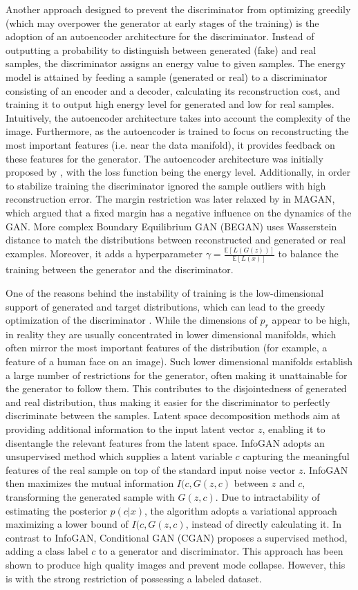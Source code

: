 Another approach designed to prevent the discriminator from optimizing greedily (which may overpower the generator at early stages of the training) is the adoption of an autoencoder architecture for the discriminator. Instead of outputting a probability to distinguish between generated (fake) and real samples, the discriminator assigns an energy value to given samples. The energy model is attained by feeding a sample (generated or real) to a discriminator consisting of an encoder and a decoder, calculating its reconstruction cost, and training it to output high energy level for generated and low for real samples. Intuitively, the autoencoder architecture takes into account the complexity of the image. Furthermore, as the autoencoder is trained to focus on reconstructing the most important features (i.e. near the data manifold), it provides feedback on these features for the generator. The autoencoder architecture was initially proposed by , with the loss function being the energy level. Additionally, in order to stabilize training the discriminator ignored the sample outliers with high reconstruction error. The margin restriction was later relaxed by  in MAGAN, which argued that a fixed margin has a negative influence on the dynamics of the GAN. More complex Boundary Equilibrium GAN (BEGAN)  uses Wasserstein distance to match the distributions between reconstructed and generated or real examples. Moreover, it adds a hyperparameter $\gamma = \frac{\mathbb{E}[L(G(z))]}{\mathbb{E}[L(x)]}$ to balance the training between the generator and the discriminator.

One of the reasons behind the instability of training is the low-dimensional support of generated and target distributions, which can lead to the greedy optimization of the discriminator . While the dimensions of $p_{r}$ appear to be high, in reality they are usually concentrated in lower dimensional manifolds, which often mirror the most important features of the distribution (for example, a feature of a human face on an image). Such lower dimensional manifolds establish a large number of restrictions for the generator, often making it unattainable for the generator to follow them. This contributes to the disjointedness of generated and real distribution, thus making it easier for the discriminator to perfectly discriminate between the samples.
Latent space decomposition methods aim at providing additional information to the input latent vector $z$, enabling it to disentangle the relevant features from the latent space. InfoGAN  adopts an unsupervised method which supplies a latent variable $c$ capturing the meaningful features of the real sample on top of the standard input noise vector $z$. InfoGAN then maximizes the mutual information $I(c, G(z,c)$ between $z$ and $c$, transforming the generated sample with $G(z, c)$. Due to intractability of estimating the posterior $p(c|x)$, the algorithm adopts a variational approach maximizing a lower bound of $I(c, G(z,c)$, instead of directly calculating it.
In contrast to InfoGAN, Conditional GAN (CGAN)  proposes a supervised method, adding a class label $c$ to a generator and discriminator. This approach has been shown to produce high quality images and prevent mode collapse. However, this is with the strong restriction of possessing a labeled dataset.

